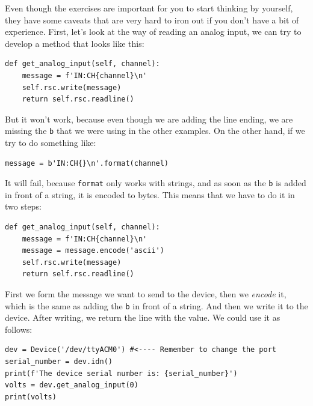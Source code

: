 

Even though the exercises are important for you to start thinking by yourself, they have some caveats that are very hard to iron out if you don't have a bit of experience. First, let's look at the way of reading an analog input, we can try to develop a method that looks like this:

\begin{verbatim}
def get_analog_input(self, channel):
    message = f'IN:CH{channel}\n'
    self.rsc.write(message)
    return self.rsc.readline()
\end{verbatim}

But it won't work, because even though we are adding the line ending, we are missing the \texttt{b} that we were using in the other examples. On the other hand, if we try to do something like:

\begin{verbatim}
message = b'IN:CH{}\n'.format(channel)
\end{verbatim}

It will fail, because \texttt{format} only works with strings, and as soon as the \texttt{b} is added in front of a string, it is encoded to bytes. This means that we have to do it in two steps:

\begin{verbatim}
def get_analog_input(self, channel):
    message = f'IN:CH{channel}\n'
    message = message.encode('ascii')
    self.rsc.write(message)
    return self.rsc.readline()
\end{verbatim}

First we form the message we want to send to the device, then we \emph{encode} it, which is the same as adding the \texttt{b} in front of a string. And then we write it to the device. After writing, we return the line with the value. We could use it as follows:

\begin{verbatim}
dev = Device('/dev/ttyACM0') #<---- Remember to change the port
serial_number = dev.idn()
print(f'The device serial number is: {serial_number}')
volts = dev.get_analog_input(0)
print(volts)
\end{verbatim}

